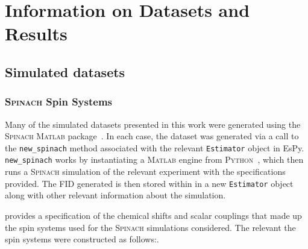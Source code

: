\chapter{Information on Datasets and Results}
\label{chap:datasets}

\section{Simulated datasets}
\label{sec:simulated-datasets}

\subsection{\textsc{Spinach} Spin Systems}
Many of the simulated datasets presented in this work were generated using the
\textsc{Spinach} \textsc{Matlab} package~\cite{Hogben2011}.
In each case, the dataset was generated via a call to the \texttt{new\_spinach}
method associated with the relevant \texttt{Estimator} object in \ac{EsPy}.
\texttt{new\_spinach} works by instantiating a \textsc{Matlab} engine from
\textsc{Python}~\cite{MatlabEngine}, which then runs a \textsc{\textsc{Spinach}}
simulation of the relevant experiment with the specifications provided. The
\ac{FID} generated is then stored within in a new \texttt{Estimator} object
along with other relevant information about the simulation.

 provides a specification of the chemical
shifts and scalar couplings that made up the spin systems used for the
\textsc{Spinach} simulations considered.
The relevant the spin systems were constructed as follows:.
